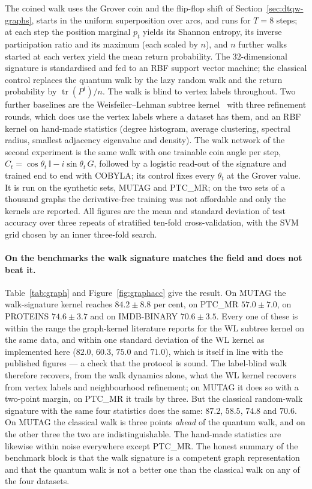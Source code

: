 The coined walk uses the Grover coin and the flip-flop shift of
Section~\ref{sec:dtqw-graphs}, starts in the uniform superposition over
arcs, and runs for $T = 8$ steps; at each step the position marginal $p_t$
yields its Shannon entropy, its inverse participation ratio and its maximum
(each scaled by $n$), and $n$ further walks started at each vertex yield the
mean return probability. The $32$-dimensional signature is standardised and
fed to an RBF support vector machine; the classical control replaces the
quantum walk by the lazy random walk and the return probability by
$\operatorname{tr}(P^t)/n$. The walk is blind to vertex labels throughout.
Two further baselines are the Weisfeiler--Lehman subtree
kernel~\cite{Shervashidze_2011} with three refinement rounds, which does use
the vertex labels where a dataset has them, and an RBF kernel on hand-made
statistics (degree histogram, average clustering, spectral radius, smallest
adjacency eigenvalue and density). The walk network of the second experiment
is the same walk with one trainable coin angle per step, $C_t =
\cos\theta_t\,\mathbb{I} - i\sin\theta_t\,G$, followed by a logistic
read-out of the signature and trained end to end with COBYLA; its control
fixes every $\theta_t$ at the Grover value. It is run on the synthetic sets,
MUTAG and PTC\_MR; on the two sets of a thousand graphs the derivative-free
training was not affordable and only the kernels are reported. All figures
are the mean and standard deviation of test accuracy over three repeats of
stratified ten-fold cross-validation, with the SVM grid chosen by an inner
three-fold search.

\paragraph*{On the benchmarks the walk signature matches the field and does
not beat it.}
Table~\ref{tab:graph} and Figure~\ref{fig:graphacc} give the result. On
MUTAG the walk-signature kernel reaches $84.2 \pm 8.8$ per cent, on PTC\_MR
$57.0 \pm 7.0$, on PROTEINS $74.6 \pm 3.7$ and on IMDB-BINARY $70.6 \pm
3.5$. Every one of these is within the range the graph-kernel literature
reports for the WL subtree kernel on the same data, and within one standard
deviation of the WL kernel as implemented here ($82.0$, $60.3$, $75.0$ and
$71.0$), which is itself in line with the published figures --- a check that
the protocol is sound. The label-blind walk therefore recovers, from the walk
dynamics alone, what the WL kernel recovers from vertex labels and
neighbourhood refinement; on MUTAG it does so with a two-point margin, on
PTC\_MR it trails by three. But the classical random-walk signature with the
same four statistics does the same: $87.2$, $58.5$, $74.8$ and $70.6$. On
MUTAG the classical walk is three points \emph{ahead} of the quantum walk,
and on the other three the two are indistinguishable. The hand-made
statistics are likewise within noise everywhere except PTC\_MR. The honest
summary of the benchmark block is that the walk signature is a competent
graph representation and that the quantum walk is not a better one than the
classical walk on any of the four datasets.

